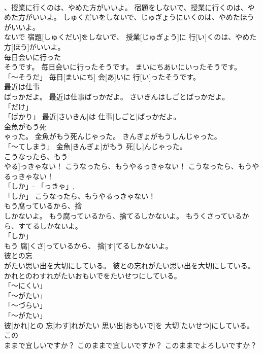 \documentclass[8pt]{extreport}
\begin{document}
\begin{CJK}{UTF8}{min}
\\	、授業に行くのは、やめた方がいいよ。	宿題をしないで、授業に行くのは、やめた方がいいよ。	しゅくだいをしないで、じゅぎょうにいくのは、やめたほうがいいよ。	
\\	ないで	宿題[しゅくだい]をしないで、 授業[じゅぎょう]に 行[い]くのは、やめた 方[ほう]がいいよ。		
\\	毎日会いに行った
\\	そうです。	毎日会いに行ったそうです。	まいにちあいにいったそうです。	
\\	「～そうだ」	毎日[まいにち] 会[あ]いに 行[い]ったそうです。		
\\	最近は仕事
\\	ばっかだよ。	最近は仕事ばっかだよ。	さいきんはしごとばっかだよ。	
\\	「だけ」 
\\	「ばかり」	最近[さいきん]は 仕事[しごと]ばっかだよ。		
\\	金魚がもう死
\\	ゃった。	金魚がもう死んじゃった。	きんぎょがもうしんじゃった。	
\\	「～てしまう」	金魚[きんぎょ]がもう 死[し]んじゃった。		
\\	こうなったら、もう
\\	やる]っきゃない！	こうなったら、もうやるっきゃない！	こうなったら、もうやるっきゃない！	
\\	「しか」- 「っきゃ」, 
\\	「しか」	こうなったら、もうやるっきゃない！		
\\	もう腐っているから、捨
\\	しかないよ。	もう腐っているから、捨てるしかないよ。	もうくさっているから、すてるしかないよ。	
\\	「しか」 
\\	もう 腐[くさ]っているから、 捨[す]てるしかないよ。		
\\	彼との忘
\\	がたい思い出を大切にしている。	彼との忘れがたい思い出を大切にしている。	かれとのわすれがたいおもいでをたいせつにしている。	
\\	「～にくい」 
\\	「～がたい」 
\\	「～づらい」 
\\	「～がたい」 
\\	彼[かれ]との 忘[わす]れがたい 思い出[おもいで]を 大切[たいせつ]にしている。		
\\	この
\\	ままで宜しいですか？	このままで宜しいですか？	このままでよろしいですか？	

\end{CJK}
\end{document}
